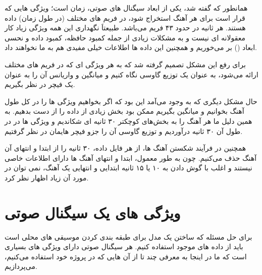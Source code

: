 \documentclass[12pt,onecolumn,a4paper]{article}
\begin{document}
همانطور که گفته شد، یکی از ابعاد سیگنال های صوتی، زمان است؛ ویژگی هایی که قرار است برای هر آهنگ استخراج شود، در فریم های مختلف (در طول زمان) داده هستند.
هر ثانیه در حدود ۴۳ فریم می‌باشد. طبیعتاَ نگهداری این همه ویژگی زیاد کار معقولانه ای نیست و به مشکلات زیادی از جمله کمبود حافظه، کمبود داده و نحسی ابعاد () بر می‌خوریم و همچنین این داده ها اطلاعات خیلی مفیدی هم به ما نخواهند داد.

برای رفع این مشکل تصمیم گرفته شد که  به هر ویژگی ای که در فریم های مختلف ارائه می‌شود، به عنوان یک توزیع
گاوسی نگاه کنیم و میانگین و واریانس آن را به عنوان یک فیچر در نظر بگیریم.

حال مشکل دیگری که به وجود می‌آمد این بود که اگر بخواهیم ویژگی ها را در کل طول آهنگ بخوانیم و میانگین بگیریم ممکن بود بخش زیادی از داده را از دست بدهیم. به همین دلیل ما هر آهنگ را به بخش‌های کوچکتر ۳۰ ثانیه ای شکاندیم و ویژگی ها در در طول آن ۳۰ ثانیه درآوردیم و توزیع گاوسی آن را جزو فیچر هایمان در نظر گرفتیم. 

همچنین در فرآیند شکستن آهنگ ها، از هر فایل داده، ۳۰ ثانیه را از ابتدا و انتهای آن آهنگ حذف می‌کنیم. چون به طور معمول، ابتدا و انتهای آهنگ ها دارای اطلاعات خاصی نیستند و اغلب با گوش دادن به ۱۰ یا ۱۵ ثانیه ابتدایی و انتهایی یک آهنگ، نمی توان در مورد آن زیاد اظهار نظر کرد.


\section{ویژگی های یک سیگنال صوتی}
برای حل مسئله که ساختن یک مدل برای طبقه بندی کردن موسیقی های محلی است باید از داده های موجود استفاده کنیم. هر سیگنال صوتی دارای ویژگی های بسیاری است که ما در اینجا به معرفی چند تا از آن هایی که در پروژه خود استفاده می‌کنیم، می‌پردازیم.
\end{document}
